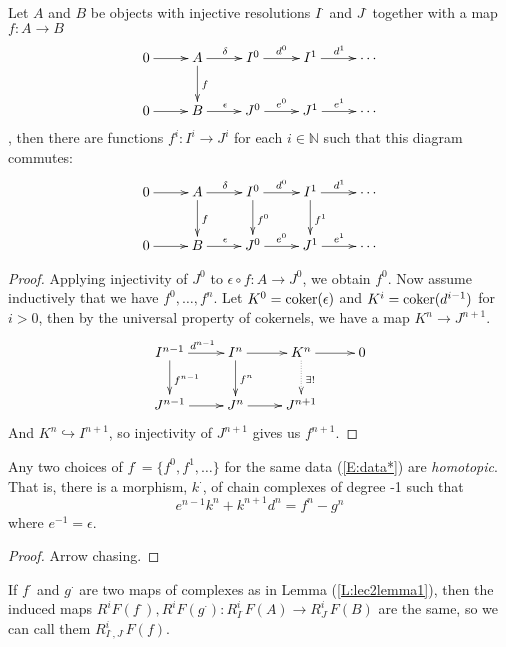 \begin{lemma}\label{L:lec2lemma1} Let $A$ and $B$ be objects with injective
resolutions $I^{\cdot}$ and $J^{\cdot}$ together with a map
$f:A\to B$
 \begin{equation}
 \xymatrix{
 0\ar[r] & A \ar[r]^{\delta}\ar[d]^f & I^0\ar[r]^{d^0} & I^1 \ar[r]^{d^1}&\cdots \\
 0\ar[r] & B \ar[r]^{\epsilon} & J^0\ar[r]^{e^0} & J^1\ar[r]^{e^1} & \cdots
} \label{E:data*} \end{equation}
 , then there are functions $f^i:I^i\to J^i$ for each $i\in
\mathbb{N}$ such that this diagram commutes:
 \[\xymatrix{
 0\ar[r] & A \ar[r]^{\delta}\ar[d]^f & I^0\ar[r]^{d^0}\ar[d]^{f^0} & I^1 \ar[r]^{d^1}\ar[d]^{f^1}&\cdots \\
 0\ar[r] & B \ar[r]^{\epsilon} & J^0\ar[r]^{e^0} & J^1\ar[r]^{e^1} & \cdots
}\]
\end{lemma}
\begin{proof}
Applying injectivity of $J^0$ to $\epsilon\circ f:A\to J^0$, we
obtain $f^0$.  Now assume inductively that we have $f^0,\dots,
f^n$.  Let $K^0=\text{\rm coker} (\epsilon)$ and $K^i = \text{\rm coker}(d^{i-1})$ for
$i>0$, then by the universal property of cokernels, we have a map
$K^n\to J^{n+1}$.
\[\xymatrix{
 I^{n-1} \ar[r]^{d^{n-1}}\ar[d]^{f^{n-1}} & I^n \ar[r]\ar[d]^{f^n} & K^n \ar[r]\ar@{.>}[d]^{\exists !} & 0\\
 J^{n-1} \ar[r] & J^n \ar[r] & J^{n+1}
}\]
 And $K^n\hookrightarrow I^{n+1}$, so injectivity of $J^{n+1}$
 gives us $f^{n+1}$.
\end{proof}

\begin{lemma}\label{L:lec2lemma2} Any two choices of $f^{\cdot} =
\{f^0,f^1,\dots\}$ for the same data (\ref{E:data*}) are
\emph{homotopic}.  That is, there is a morphism, $k^{\cdot}$, of
chain complexes of degree -1 such that
\[
    e^{n-1}k^n + k^{n+1}d^n = f^n-g^n
\]
where $e^{-1}=\epsilon$.
\end{lemma}
\begin{proof}
Arrow chasing.
\end{proof}

\begin{corollary}
If $f^{\cdot}$ and $g^{\cdot}$ are two maps of complexes as in
Lemma (\ref{L:lec2lemma1}), then the induced maps
$R^iF(f^{\cdot}), R^iF(g^{\cdot}): R_{I^{\cdot}}^iF(A) \to
R_{J^{\cdot}}^iF(B)$ are the same, so we can call them
$R_{I^{\cdot},J^{\cdot}}^iF(f)$.
\end{corollary}


